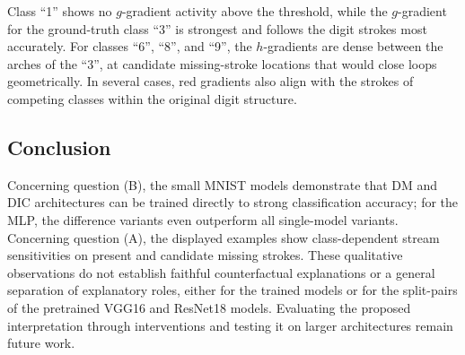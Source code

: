 Class ``1'' shows no $g$-gradient activity above the threshold, while the $g$-gradient for the ground-truth class ``3'' is strongest and follows the digit strokes most accurately.
For classes ``6'', ``8'', and ``9'', the $h$-gradients are dense between the arches of the ``3'', at candidate missing-stroke locations that would close loops geometrically.
In several cases, red gradients also align with the strokes of competing classes within the original digit structure.

\subsection{Conclusion}

Concerning question (B), the small MNIST models demonstrate that DM and DIC architectures can be trained directly to strong classification accuracy; for the MLP, the difference variants even outperform all single-model variants.
Concerning question (A), the displayed examples show class-dependent stream sensitivities on present and candidate missing strokes. These qualitative observations do not establish faithful counterfactual explanations or a general separation of explanatory roles, either for the trained models or for the split-pairs of the pretrained VGG16 and ResNet18 models.
Evaluating the proposed interpretation through interventions and testing it on larger architectures remain future work.

